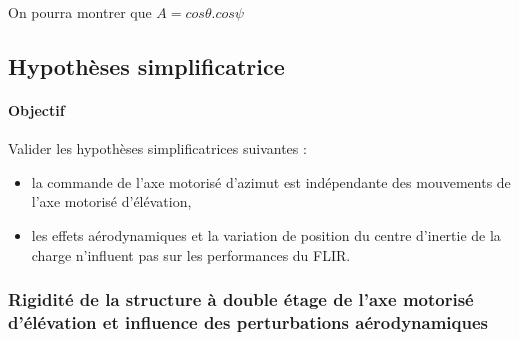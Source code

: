 On pourra montrer que $A=cos\theta.cos\psi$


\subsection{Hypothèses simplificatrice}

\paragraph{Objectif} Valider les hypothèses simplificatrices suivantes :
\begin{itemize}
 \item la commande de l'axe motorisé d'azimut est indépendante des mouvements de l'axe motorisé
d'élévation,
 \item les effets aérodynamiques et la variation de position du centre d'inertie de la charge n'influent pas sur les performances du FLIR.
\end{itemize}

%
%
%
%

\subsubsection{Rigidité de la structure à double étage de l'axe motorisé d'élévation et influence des perturbations aérodynamiques}


